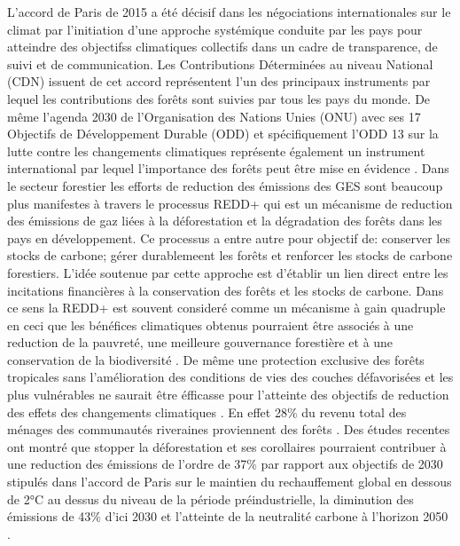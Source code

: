 \documentclass[
  12pt,
  a4paper,
  extrafontsizes,
  onecolumn,
  openright]{book}
\theoremstyle{definition}
\theoremstyle{definition}
\theoremstyle{definition}
\theoremstyle{definition}
\theoremstyle{remark}
\begin{document}
\begin{itemize}
  L'accord de Paris de 2015 a été décisif dans les négociations internationales sur le climat par l'initiation d'une approche systémique conduite par les pays pour atteindre des objectifss climatiques collectifs dans un cadre de transparence, de suivi et de communication.
  Les Contributions Déterminées au niveau National (CDN) issuent de cet accord représentent l'un des principaux instruments par lequel les contributions des forêts sont suivies par tous les pays du monde.
  De même l'agenda 2030 de l'Organisation des Nations Unies (ONU) avec ses 17 Objectifs de Développement Durable (ODD) et spécifiquement l'ODD 13 sur la lutte contre les changements climatiques représente également un instrument international par lequel l'importance des forêts peut être mise en évidence \citep{Mbairamadji2022}.
  Dans le secteur forestier les efforts de reduction des émissions des GES sont beaucoup plus manifestes à travers le processus REDD+ qui est un mécanisme de reduction des émissions de gaz liées à la déforestation et la dégradation des forêts dans les pays en développement.
  Ce processus a entre autre pour objectif de: conserver les stocks de carbone; gérer durablemeent les forêts et renforcer les stocks de carbone forestiers.
  L'idée soutenue par cette approche est d'établir un lien direct entre les incitations financières à la conservation des forêts et les stocks de carbone.
  Dans ce sens la REDD+ est souvent consideré comme un mécanisme à gain quadruple en ceci que les bénéfices climatiques obtenus pourraient être associés à une reduction de la pauvreté, une meilleure gouvernance forestière et à une conservation de la biodiversité \citep{Duchelle2018}.
  De même une protection exclusive des forêts tropicales sans l'amélioration des conditions de vies des couches défavorisées et les plus vulnérables ne saurait être éfficasse pour l'atteinte des objectifs de reduction des effets des changements climatiques \citep{Seymour_Busch2016}.
  En effet 28\% du revenu total des ménages des communautés riveraines proviennent des forêts \citep{Angelsen2014}. Des études recentes ont montré que stopper la déforestation et ses corollaires pourraient contribuer à une reduction des émissions de l'ordre de 37\% par rapport aux objectifs de 2030 stipulés dans l'accord de Paris sur le maintien du rechauffement global en dessous de 2°C au dessus du niveau de la période préindustrielle, la diminution des émissions de 43\% d'ici 2030 et l'atteinte de la neutralité carbone à l'horizon 2050 \citep{Griscom2017}.


\end{itemize}
\end{document}
